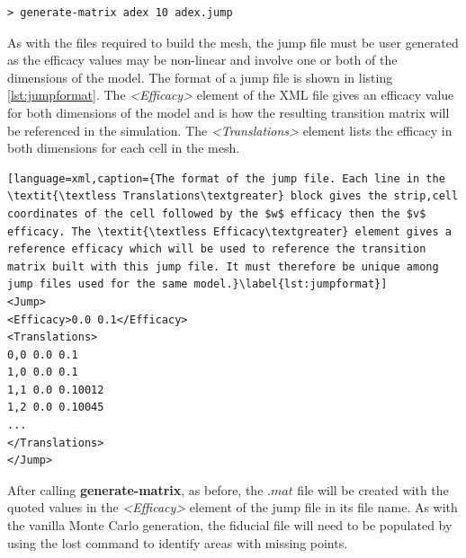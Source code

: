 \documentclass[utf8]{frontiersSCNS} %
\begin{document}
\begin{lstlisting}[language=xml]
> generate-matrix adex 10 adex.jump
\end{lstlisting}

As with the files required to build the mesh, the jump file must be user generated as the efficacy values may be non-linear and involve one or both of the dimensions of the model. The format of a jump file is shown in listing \ref{lst:jumpformat}. The \textit{\textless Efficacy\textgreater} element of the XML file gives an efficacy value for both dimensions of the model and is how the resulting transition matrix will be referenced in the simulation. The \textit{\textless Translations\textgreater} element lists the efficacy in both dimensions for each cell in the mesh.

\begin{lstlisting}[language=xml,caption={The format of the jump file. Each line in the  \textit{\textless Translations\textgreater} block gives the strip,cell coordinates of the cell followed by the $w$ efficacy then the $v$ efficacy. The \textit{\textless Efficacy\textgreater} element gives a reference efficacy which will be used to reference the transition matrix built with this jump file. It must therefore be unique among jump files used for the same model.}\label{lst:jumpformat}]
<Jump>
<Efficacy>0.0 0.1</Efficacy>
<Translations>
0,0	0.0	0.1
1,0	0.0	0.1
1,1	0.0	0.10012
1,2	0.0	0.10045
...
</Translations>
</Jump>
\end{lstlisting}

After calling \textbf{generate-matrix}, as before, the $.mat$ file will be created with the quoted values in the \textit{\textless Efficacy\textgreater} element of the jump file in its file name. As with the vanilla Monte Carlo generation, the fiducial file will need to be populated by using the lost command to identify areas with missing points. \\
\end{document}
